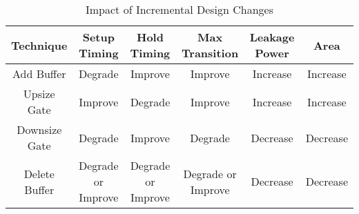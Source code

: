 
\begin{table*}
\caption{Impact of Incremental Design Changes}
\label{table:Change}
\centering
\begin{tabular}{|c|c|c|c|c|c|} \hline
Technique & Setup Timing & Hold Timing & Max Transition & Leakage Power & Area \\ \hline
Add Buffer & Degrade & Improve & Improve & Increase & Increase\\ \hline
Upsize Gate & Improve & Degrade & Improve & Increase & Increase \\ \hline
Downsize Gate & Degrade & Improve & Degrade & Decrease & Decrease \\ \hline
Delete Buffer & Degrade or Improve & Degrade or Improve & Degrade or Improve & Decrease & Decrease \\ \hline
\end{tabular}
\vspace{-1em}
\end{table*}


